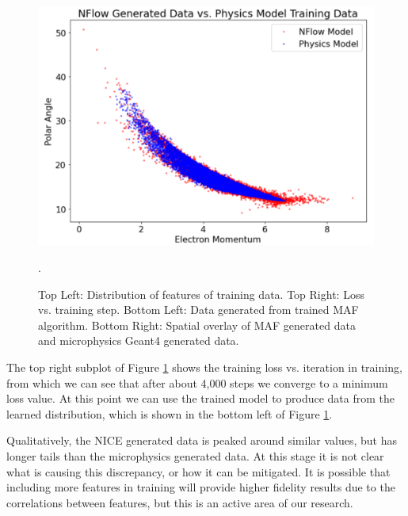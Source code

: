 \begin{figure}[!ht]
\begin{minipage}{0.5\textwidth}
        \includegraphics[width=1\textwidth,trim={0 0 0 0},clip]{pictures/nflow_vs_gemc.png}
    \end{minipage}
    \caption{Top Left: Distribution of features of training data. Top Right: Loss vs. training step. Bottom Left: Data generated from trained MAF algorithm. Bottom Right: Spatial overlay of MAF generated data and microphysics Geant4 generated data.}
    \label{fig:a}.
\end{figure}

The top right subplot of Figure \ref{fig:a} shows the training loss vs. iteration in training, from which we can see that after about 4,000 steps we converge to a minimum loss value. At this point we can use the trained model to produce data from the learned distribution, which is shown in the bottom left of Figure \ref{fig:a}.

Qualitatively, the NICE generated data is peaked around similar values, but has longer tails than the microphysics generated data. At this stage it is not clear what is causing this discrepancy, or how it can be mitigated. It is possible that including more features in training will provide higher fidelity results due to the correlations between features, but this is an active area of our research.

